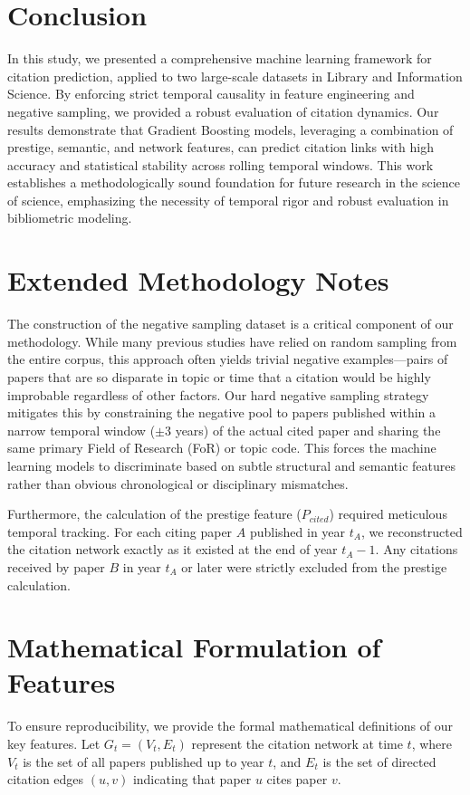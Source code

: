 \documentclass[12pt,a4paper]{article}
\begin{document}
\section{Conclusion}
In this study, we presented a comprehensive machine learning framework for citation prediction, applied to two large-scale datasets in Library and Information Science. By enforcing strict temporal causality in feature engineering and negative sampling, we provided a robust evaluation of citation dynamics. Our results demonstrate that Gradient Boosting models, leveraging a combination of prestige, semantic, and network features, can predict citation links with high accuracy and statistical stability across rolling temporal windows. This work establishes a methodologically sound foundation for future research in the science of science, emphasizing the necessity of temporal rigor and robust evaluation in bibliometric modeling.

\newpage
\appendix
\section{Extended Methodology Notes}
The construction of the negative sampling dataset is a critical component of our methodology. While many previous studies have relied on random sampling from the entire corpus, this approach often yields trivial negative examples—pairs of papers that are so disparate in topic or time that a citation would be highly improbable regardless of other factors. Our hard negative sampling strategy mitigates this by constraining the negative pool to papers published within a narrow temporal window ($\pm 3$ years) of the actual cited paper and sharing the same primary Field of Research (FoR) or topic code. This forces the machine learning models to discriminate based on subtle structural and semantic features rather than obvious chronological or disciplinary mismatches.

Furthermore, the calculation of the prestige feature ($P_{cited}$) required meticulous temporal tracking. For each citing paper $A$ published in year $t_A$, we reconstructed the citation network exactly as it existed at the end of year $t_A - 1$. Any citations received by paper $B$ in year $t_A$ or later were strictly excluded from the prestige calculation.

\section{Mathematical Formulation of Features}
To ensure reproducibility, we provide the formal mathematical definitions of our key features. Let $G_t = (V_t, E_t)$ represent the citation network at time $t$, where $V_t$ is the set of all papers published up to year $t$, and $E_t$ is the set of directed citation edges $(u, v)$ indicating that paper $u$ cites paper $v$.
\end{document}
